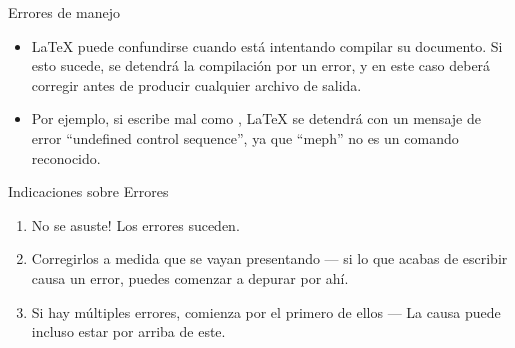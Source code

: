 \documentclass{beamer}
\begin{document}
\begin{frame}[fragile]{Errores de manejo}
  \begin{itemize}
  \item \LaTeX{} puede confundirse cuando está intentando compilar su
    documento. Si esto sucede, se detendrá la compilación por un
    error, y en este caso deberá corregir antes de producir cualquier
    archivo de salida. 
  \item Por ejemplo, si escribe mal  como ,
    \LaTeX{} se detendrá con un mensaje de error ``undefined control
    sequence'', ya que ``meph'' no es un comando reconocido.
  \end{itemize}
  \begin{block}{Indicaciones sobre Errores}
    \begin{enumerate}
    \item No se asuste! Los errores suceden.
    \item Corregirlos a medida que se vayan presentando --- si lo que
      acabas de escribir causa un error, puedes comenzar a depurar por ahí.
    \item Si hay múltiples errores, comienza por el primero de ellos
      --- La causa puede incluso estar por arriba de este.
    \end{enumerate}
  \end{block}
\end{frame}

\end{document}
